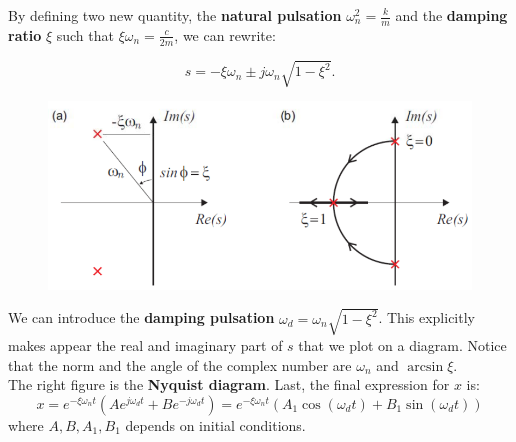 			By defining two new quantity, the \textbf{natural pulsation} $\omega _n ^2 = \frac{k}{m}$ and the \textbf{damping ratio} $\xi$ such that $\xi \omega _n = \frac{c}{2m}$, we can rewrite:
			
			\begin{equation}
			s = - \xi \omega _n \pm j\omega _n \sqrt{1 -\xi ^2}.
			\end{equation}
			
			\begin{figure}
			\vspace{-5mm}
			\includegraphics[scale=0.35]{ch1/5}
			\end{figure}
			We can introduce the \textbf{damping pulsation} $\omega _d = \omega _n \sqrt{1-\xi ^2}$. This explicitly makes appear the real and imaginary part of $s$ that we plot on a diagram. Notice that the norm and the angle of the complex number are $\omega _n$ and $\arcsin \xi$. \\
			
			The right figure is the \textbf{Nyquist diagram}. Last, the final expression for $x$ is:
			\begin{equation}
			x = e^{-\xi \omega _n t} \left( Ae^{j\omega _d t}+ Be^{-j\omega _d t} \right) = e^{-\xi \omega _n t} \left( A_1\cos (\omega _d t)+ B_1 \sin (\omega _d t) \right)
			\label{eq:1.8}
			\end{equation}
			where $A,B,A_1,B_1$ depends on initial conditions. 
			
